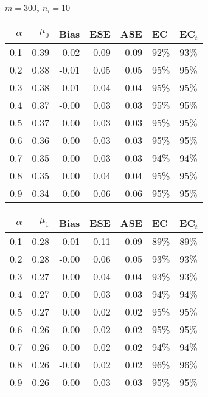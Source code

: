 \documentclass[12pt, letterpaper]{article}
\begin{document}
\clearpage


\begin{center}
	\textbf{$m=300$, $n_i=10$} 
\end{center}
\begin{table}[ht!]
	\centering
	\bgroup
	\def\arraystretch{1.25}
	\setlength\tabcolsep{0.05in}
	\begin{tabular}{rrrrrll}
		\hline
		$\alpha$ & $\mu_0$ & Bias & ESE & ASE & EC & EC$_t$ \\ 
				\hline
		0.1 & 0.39 & -0.02 & 0.09 & 0.09 & 92\% & 93\% \\ 
		0.2 & 0.38 & -0.01 & 0.05 & 0.05 & 95\% & 95\% \\ 
		0.3 & 0.38 & -0.01 & 0.04 & 0.04 & 95\% & 95\% \\ 
		0.4 & 0.37 & -0.00 & 0.03 & 0.03 & 95\% & 95\% \\ 
		0.5 & 0.37 & 0.00 & 0.03 & 0.03 & 95\% & 95\% \\ 
		0.6 & 0.36 & 0.00 & 0.03 & 0.03 & 95\% & 95\% \\ 
		0.7 & 0.35 & 0.00 & 0.03 & 0.03 & 94\% & 94\% \\ 
		0.8 & 0.35 & 0.00 & 0.04 & 0.04 & 95\% & 95\% \\ 
		0.9 & 0.34 & -0.00 & 0.06 & 0.06 & 95\% & 95\% \\ 
		\hline
	\end{tabular}
	\egroup
	\quad 
	\bgroup
	\setlength\tabcolsep{0.05in}
	\def\arraystretch{1.25}
	\begin{tabular}{rrrrrll}
		\hline
		$\alpha$ & $\mu_1$ & Bias & ESE & ASE & EC & EC$_t$ \\
				\hline
		0.1 & 0.28 & -0.01 & 0.11 & 0.09 & 89\% & 89\% \\ 
		0.2 & 0.28 & -0.00 & 0.06 & 0.05 & 93\% & 93\% \\ 
		0.3 & 0.27 & -0.00 & 0.04 & 0.04 & 93\% & 93\% \\ 
		0.4 & 0.27 & 0.00 & 0.03 & 0.03 & 94\% & 94\% \\ 
		0.5 & 0.27 & 0.00 & 0.02 & 0.02 & 95\% & 95\% \\ 
		0.6 & 0.26 & 0.00 & 0.02 & 0.02 & 95\% & 95\% \\ 
		0.7 & 0.26 & 0.00 & 0.02 & 0.02 & 94\% & 94\% \\ 
		0.8 & 0.26 & -0.00 & 0.02 & 0.02 & 96\% & 96\% \\ 
		0.9 & 0.26 & -0.00 & 0.03 & 0.03 & 95\% & 95\% \\ 
		\hline
	\end{tabular}

\end{table}
\end{document}
